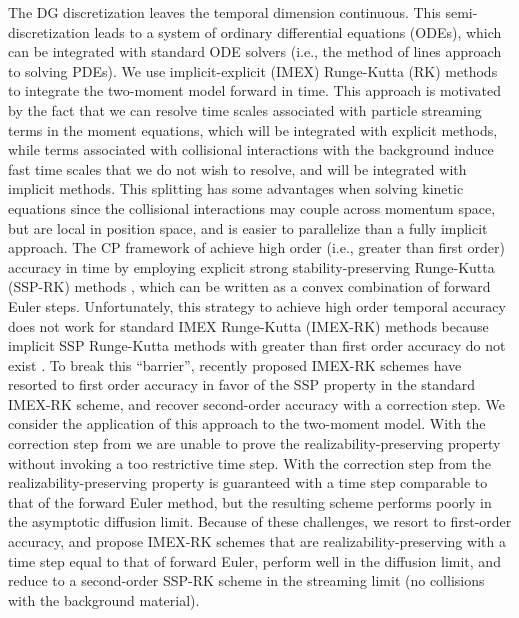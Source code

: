 The DG discretization leaves the temporal dimension continuous.  
This semi-discretization leads to a system of ordinary differential equations (ODEs), which can be integrated with standard ODE solvers (i.e., the method of lines approach to solving PDEs).  
We use implicit-explicit (IMEX) Runge-Kutta (RK) methods \cite{ascher_etal_1997,pareschiRusso_2005} to integrate the two-moment model forward in time.  
This approach is motivated by the fact that we can resolve time scales associated with particle streaming terms in the moment equations, which will be integrated with explicit methods, while terms associated with collisional interactions with the background induce fast time scales that we do not wish to resolve, and will be integrated with implicit methods.  
This splitting has some advantages when solving kinetic equations since the collisional interactions may couple across momentum space, but are local in position space, and is easier to parallelize than a fully implicit approach.  
The CP framework of \cite{zhangShu_2010a} achieve high order (i.e., greater than first order) accuracy in time by employing explicit strong stability-preserving Runge-Kutta (SSP-RK) methods \cite{shuOsher_1988,gottlieb_etal_2001}, which can be written as a convex combination of forward Euler steps.  
Unfortunately, this strategy to achieve high order temporal accuracy does not work for standard IMEX Runge-Kutta (IMEX-RK) methods because implicit SSP Runge-Kutta methods with greater than first order accuracy do not exist \cite{gottlieb_etal_2001}.  
To break this ``barrier'', recently proposed IMEX-RK schemes \cite{chertock_etal_2015,hu_etal_2018} have resorted to first order accuracy in favor of the SSP property in the standard IMEX-RK scheme, and recover second-order accuracy with a correction step.  
We consider the application of this approach to the two-moment model.  
With the correction step from \cite{chertock_etal_2015} we are unable to prove the realizability-preserving property without invoking a too restrictive time step.  
With the correction step from \cite{hu_etal_2018} the realizability-preserving property is guaranteed with a time step comparable to that of the forward Euler method, but the resulting scheme performs poorly in the asymptotic diffusion limit.  
Because of these challenges, we resort to first-order accuracy, and propose IMEX-RK schemes that are realizability-preserving with a time step equal to that of forward Euler, perform well in the diffusion limit, and reduce to a second-order SSP-RK scheme in the streaming limit (no collisions with the background material).  

